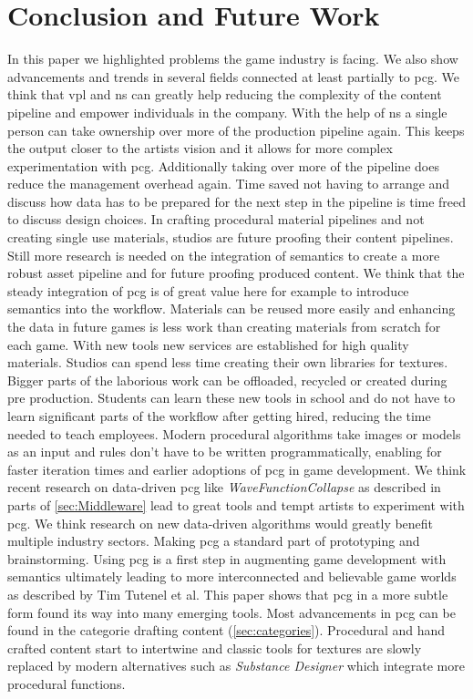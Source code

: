 \documentclass[10pt,a4paper]{article}
\begin{document}
\section{Conclusion and Future Work}
\begin{multicols}{2}
In this paper we highlighted problems the game industry is facing. We also show advancements and trends in several fields connected at least partially to \gls{pcg}. We think that \gls{vpl} and \gls{ns} can greatly help reducing the complexity of the content pipeline and empower individuals in the company. With the help of \gls{ns} a single person can take ownership over more of the production pipeline again. This keeps the output closer to the artists vision and it allows for more complex experimentation with \gls{pcg}. Additionally taking over more of the pipeline does reduce the management overhead again. Time saved not having to arrange and discuss how data has to be prepared for the next step in the pipeline is time freed to discuss design choices. In crafting procedural material pipelines and not creating single use materials, studios are future proofing their content pipelines. Still more research is needed on the integration of semantics to create a more robust asset pipeline and for future proofing produced content. We think that the steady integration of \gls{pcg} is of great value here for example to introduce semantics into the workflow. Materials can be reused more easily and enhancing the data in future games is less work than creating materials from scratch for each game. With new tools new services are established for high quality materials. Studios can spend less time creating their own libraries for textures. Bigger parts of the laborious work can be offloaded, recycled or created during pre production. Students can learn these new tools in school and do not have to learn significant parts of the workflow after getting hired, reducing the time needed to teach employees. Modern procedural algorithms take images or models as an input and rules don’t have to be written programmatically, enabling for faster iteration times and earlier adoptions of \gls{pcg} in game development. We think recent research on data-driven \gls{pcg} like \textit{WaveFunctionCollapse} as described in parts of \autoref{sec:Middleware} lead to great tools and tempt artists to experiment with \gls{pcg}. We think research on new data-driven algorithms would greatly benefit multiple industry sectors. Making \gls{pcg} a standard part of prototyping and brainstorming. Using \gls{pcg} is a first step in augmenting game development with semantics ultimately leading to more interconnected and believable game worlds as described by Tim Tutenel et al. This paper shows that \gls{pcg} in a more subtle form found its way into many emerging tools. Most advancements in \gls{pcg} can be found in the categorie drafting content (\autoref{sec:categories}). Procedural and hand crafted content start to intertwine and classic tools for textures are slowly replaced by modern alternatives such as \textit{Substance Designer} which integrate more procedural functions.
\end{multicols}
\end{document}
